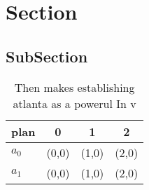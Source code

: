 \documentclass[a4paper]{article}
\begin{document}
\section{Section}

\subsection{SubSection}

\begin{table}
\begin{adjustbox}{width=0.6\columnwidth}
\begin{tabular}{|l|l|l|l|}
\hline
\textbf{plan} & \multicolumn{1}{c|}{\textbf{0}} & \multicolumn{1}{c|}{\textbf{1}} & \multicolumn{1}{c|}{\textbf{2}} \\ \hline
\textbf{$a_0$}  & (0,0) & (1,0) & (2,0) \\ \hline
\textbf{$a_1$}  & (0,0) & (1,0) & (2,0) \\ \hline
\end{tabular}
\end{adjustbox}
\caption{Then makes establishing atlanta as a powerul In v
}
\end{table}
\end{document}
